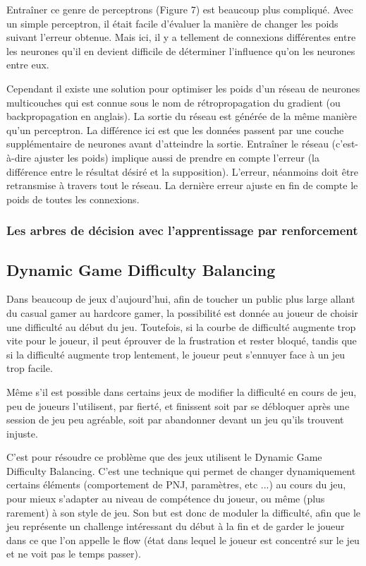 \documentclass[a4paper, 12pt]{article} %
\begin{document}
Entraîner ce genre de perceptrons (Figure 7) est beaucoup plus compliqué. Avec un simple perceptron, il était facile d’évaluer la manière de changer les poids suivant l’erreur obtenue. Mais ici, il y a tellement de connexions différentes entre les neurones qu’il en devient difficile de déterminer l’influence qu’on les neurones entre eux.

Cependant il existe une solution pour optimiser les poids d’un réseau de neurones multicouches qui est connue sous le nom de rétropropagation du gradient (ou backpropagation en anglais). La sortie du réseau est générée de la même manière qu’un perceptron. La différence ici est que les données passent par une couche supplémentaire de neurones avant d’atteindre la sortie. Entraîner le réseau (c’est-à-dire ajuster les poids) implique aussi de prendre en compte l’erreur (la différence entre le résultat désiré et la supposition). L’erreur, néanmoins doit être retransmise à travers tout le réseau. La dernière erreur ajuste en fin de compte le poids de toutes les connexions.

\newpage
\subsubsection{Les arbres de décision avec l’apprentissage par renforcement}

\newpage
\subsection{Dynamic Game Difficulty Balancing}

Dans beaucoup de jeux d’aujourd’hui, afin de toucher un public plus large allant du casual gamer au hardcore gamer, la possibilité est donnée au joueur de choisir une difficulté au début du jeu. Toutefois, si la courbe de difficulté augmente trop vite pour le joueur, il peut éprouver de la frustration et rester bloqué, tandis que si la difficulté augmente trop lentement, le joueur peut s’ennuyer face à un jeu trop facile.

Même s’il est possible dans certains jeux de modifier la difficulté en cours de jeu, peu de joueurs l’utilisent, par fierté, et finissent soit par se débloquer après une session de jeu peu agréable, soit par abandonner devant un jeu qu’ils trouvent injuste.

C’est pour résoudre ce problème que des jeux utilisent le Dynamic Game Difficulty Balancing. C’est une technique qui permet de changer dynamiquement certains éléments (comportement de PNJ, paramètres, etc ...) au cours du jeu, pour mieux s’adapter au niveau de compétence du joueur, ou même (plus rarement) à son style de jeu. Son but est donc de moduler la difficulté, afin que le jeu représente un challenge intéressant du début à la fin et de garder le joueur dans ce que l'on appelle le flow (état dans lequel le joueur est concentré sur le jeu et ne voit pas le temps passer).
\end{document}
